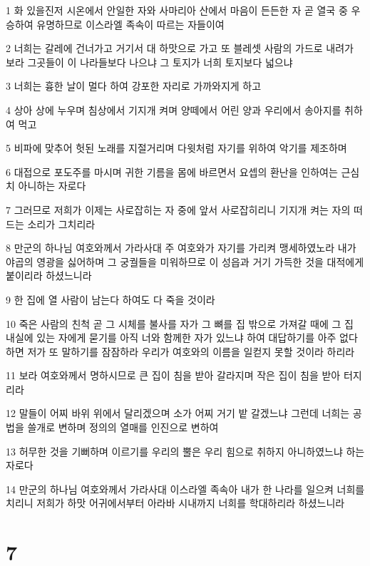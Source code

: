 \par 1 화 있을진저 시온에서 안일한 자와 사마리아 산에서 마음이 든든한 자 곧 열국 중 우승하여 유명하므로 이스라엘 족속이 따르는 자들이여
\par 2 너희는 갈레에 건너가고 거기서 대 하맛으로 가고 또 블레셋 사람의 가드로 내려가 보라 그곳들이 이 나라들보다 나으냐 그 토지가 너희 토지보다 넓으냐
\par 3 너희는 흉한 날이 멀다 하여 강포한 자리로 가까와지게 하고
\par 4 상아 상에 누우며 침상에서 기지개 켜며 양떼에서 어린 양과 우리에서 송아지를 취하여 먹고
\par 5 비파에 맞추어 헛된 노래를 지절거리며 다윗처럼 자기를 위하여 악기를 제조하며
\par 6 대접으로 포도주를 마시며 귀한 기름을 몸에 바르면서 요셉의 환난을 인하여는 근심치 아니하는 자로다
\par 7 그러므로 저희가 이제는 사로잡히는 자 중에 앞서 사로잡히리니 기지개 켜는 자의 떠드는 소리가 그치리라
\par 8 만군의 하나님 여호와께서 가라사대 주 여호와가 자기를 가리켜 맹세하였노라 내가 야곱의 영광을 싫어하며 그 궁궐들을 미워하므로 이 성읍과 거기 가득한 것을 대적에게 붙이리라 하셨느니라
\par 9 한 집에 열 사람이 남는다 하여도 다 죽을 것이라
\par 10 죽은 사람의 친척 곧 그 시체를 불사를 자가 그 뼈를 집 밖으로 가져갈 때에 그 집 내실에 있는 자에게 묻기를 아직 너와 함께한 자가 있느냐 하여 대답하기를 아주 없다 하면 저가 또 말하기를 잠잠하라 우리가 여호와의 이름을 일컫지 못할 것이라 하리라
\par 11 보라 여호와께서 명하시므로 큰 집이 침을 받아 갈라지며 작은 집이 침을 받아 터지리라
\par 12 말들이 어찌 바위 위에서 달리겠으며 소가 어찌 거기 밭 갈겠느냐 그런데 너희는 공법을 쓸개로 변하며 정의의 열매를 인진으로 변하여
\par 13 허무한 것을 기뻐하며 이르기를 우리의 뿔은 우리 힘으로 취하지 아니하였느냐 하는 자로다
\par 14 만군의 하나님 여호와께서 가라사대 이스라엘 족속아 내가 한 나라를 일으켜 너희를 치리니 저희가 하맛 어귀에서부터 아라바 시내까지 너희를 학대하리라 하셨느니라

\chapter{7}

